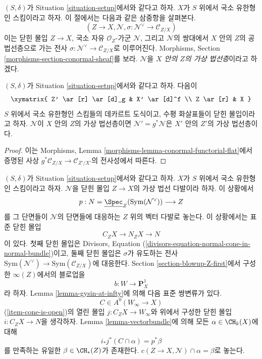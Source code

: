 \noindent
$(S, \delta)$가 Situation \ref{situation-setup}에서와 같다고 하자.
$X$가 $S$ 위에서 국소 유한형인 스킴이라고 하자. 이 절에서는 다음과
같은 삼중항을 살펴본다.
$$
(Z \to X, \mathcal{N}, \sigma : \mathcal{N}^\vee \to \mathcal{C}_{Z/X})
$$
이는 닫힌 몰입 $Z \to X$, 국소 자유 $\mathcal{O}_Z$-가군
$\mathcal{N}$, 그리고 $\mathcal{N}$의 쌍대에서 $X$ 안의 $Z$의
공법선층으로 가는 전사
$\sigma : \mathcal{N}^\vee \to \mathcal{C}_{Z/X}$로 이루어진다.
Morphisms, Section \ref{morphisms-section-conormal-sheaf}를 보라.
$\mathcal{N}$을 {\it $X$ 안의 $Z$의 가상 법선층}이라고 하겠다.

\begin{lemma}
\label{lemma-pullback-virtual-normal-sheaf}
$(S, \delta)$가 Situation \ref{situation-setup}에서와 같다고 하자.
다음이
$$
\xymatrix{
Z' \ar[r] \ar[d]_g & X' \ar[d]^f \\
Z \ar[r] & X
}
$$
$S$ 위에서 국소 유한형인 스킴들의 데카르트 도식이고, 수평 화살표들이
닫힌 몰입이라고 하자. $\mathcal{N}$이 $X$ 안의 $Z$의 가상
법선층이면 $\mathcal{N}' = g^*\mathcal{N}$은 $X'$ 안의 $Z'$의
가상 법선층이다.
\end{lemma}

\begin{proof}
이는 Morphisms, Lemma \ref{morphisms-lemma-conormal-functorial-flat}에서
증명된 사상 $g^*\mathcal{C}_{Z/X} \to \mathcal{C}_{Z'/X'}$의
전사성에서 따른다.
\end{proof}

\noindent
$(S, \delta)$가 Situation \ref{situation-setup}에서와 같다고 하자.
$X$가 $S$ 위에서 국소 유한형인 스킴이라고 하자. $\mathcal{N}$을
닫힌 몰입 $Z \to X$의 가상 법선 다발이라 하자. 이 상황에서
$$
p : N = \underline{\Spec}_Z(\text{Sym}(\mathcal{N}^\vee)) \longrightarrow Z
$$
를 그 단면들이 $\mathcal{N}$의 단면들에 대응하는 $Z$ 위의 벡터
다발로 놓는다. 이 상황에서는 표준 닫힌 몰입
$$
C_ZX \longrightarrow N_ZX \longrightarrow N
$$
이 있다. 첫째 닫힌 몰입은 Divisors, Equation
(\ref{divisors-equation-normal-cone-in-normal-bundle})이고, 둘째 닫힌
몰입은 $\sigma$가 유도하는 전사
$\text{Sym}(\mathcal{N}^\vee) \to \text{Sym}(\mathcal{C}_{Z/X})$에
대응한다. Section \ref{section-blowup-Z-first}에서 구성한
$\infty(Z)$에서의 블로업을
$$
b : W \longrightarrow \mathbf{P}^1_X
$$
라 하자. Lemma \ref{lemma-gysin-at-infty}에 의해 다음 표준 쌍변류가
있다.
$$
C \in A^0(W_\infty \to X)
$$
(\ref{item-cone-is-open})의 열린 몰입 $j : C_ZX \to W_\infty$와 위에서
구성한 닫힌 몰입 $i : C_ZX \to N$을 생각하자. Lemma
\ref{lemma-vectorbundle}에 의해 모든 $\alpha \in \CH_k(X)$에 대해
$$
i_*j^*(C \cap \alpha) = p^*\beta
$$
를 만족하는 유일한 $\beta \in \CH_*(Z)$가 존재한다.
$c(Z \to X, \mathcal{N}) \cap \alpha = \beta$로 놓는다.

